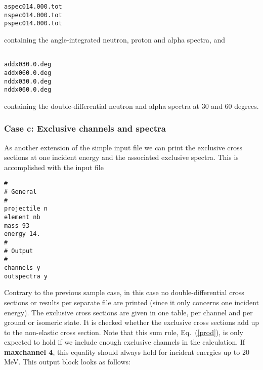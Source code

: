 \begin{samplecase}
{\begin{verbatim}
aspec014.000.tot
nspec014.000.tot
pspec014.000.tot      
\end{verbatim} } \renewcommand{\baselinestretch}{1.07}\small\normalsize
\noindent
containing the angle-integrated neutron, proton and alpha spectra, and
{\small \begin{verbatim}

addx030.0.deg
addx060.0.deg
nddx030.0.deg
nddx060.0.deg
\end{verbatim} } \renewcommand{\baselinestretch}{1.07}\small\normalsize
\noindent
containing the double-differential neutron and alpha spectra at 30 and 60 
degrees.
\subsubsection{Case c: Exclusive channels and spectra}
As another extension of the simple input file we can print the exclusive cross
sections at one incident energy and the associated exclusive spectra.
This is accomplished with the input file

{\small \begin{verbatim}
#
# General
#
projectile n
element nb
mass 93
energy 14.
#
# Output
#
channels y
outspectra y
\end{verbatim} } \renewcommand{\baselinestretch}{1.07}\small\normalsize
\noindent
Contrary to the previous sample case, in this case no double-differential 
cross sections or 
results per separate file are printed (since it only concerns one incident 
energy). The exclusive cross sections are given 
in one table, per channel and per ground or isomeric state. It is checked 
whether the exclusive cross sections add up to the non-elastic cross section. 
Note that this sum rule, Eq.~(\ref{prod}), is only expected to hold if we 
include 
enough exclusive channels in the calculation. If {\bf maxchannel 4}, this 
equality should always hold for incident energies up to 20 MeV. This output 
block looks as follows:

{\small \begin{verbatim}


\end{verbatim}}
\end{samplecase}
